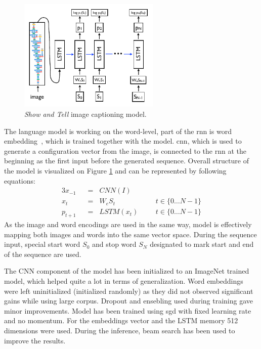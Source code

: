 \begin{figure}[!t]
	\centering
	\includegraphics[width=0.6\textwidth]{./fig/show-tell_model.pdf}
	\caption{\emph{Show and Tell} image captioning model.~\cite{DBLP:journals/corr/VinyalsTBE14}
		\label{fig:showmodel}}
\end{figure}

The language model is working on the word-level, part of the \gls{rnn} is word embedding~\cite{DBLP:journals/corr/abs-1301-3781}, which is trained together with the model. \gls{cnn}, which is used to generate a configuration vector from the image, is connected to the \gls{rnn} at the beginning as the first input before the generated sequence. Overall structure of the model is visualized on Figure \ref{fig:showmodel} and can be represented by following equations:
\begin{alignat}{3}
x_{-1}  \hspace{7pt}&=\hspace{7pt} CNN(I)& \label{eq:showmodel1}\\
x_t     \hspace{7pt}&=\hspace{7pt} W_eS_t \hspace{20pt} & t\in\{0\ldots N-1\}  \label{eq:showmodel2}\\
p_{t+1} \hspace{7pt}&=\hspace{7pt} LSTM(x_t) \hspace{20pt} & t\in\{0\ldots N-1\}  \label{eq:showmodel3}
\end{alignat}
As the image and word encodings are used in the same way, model is effectively mapping both images and words into the same vector space. During the sequence input, special start word $ S_0 $ and stop word $ S_N $ designated to mark start and end of the sequence are used.

The CNN component of the model has been initialized to an ImageNet trained model, which helped quite a lot in terms of generalization. Word embeddings were left uninitialized (initialized randomly) as they did not observed significant gains while using large corpus. Dropout and ensebling used during training gave minor improvements. Model has been trained using \gls{sgd} with fixed learning rate and no momentum. For the embeddings vector and the LSTM memory 512 dimensions were used. During the inference, beam search has been used to improve the results.

